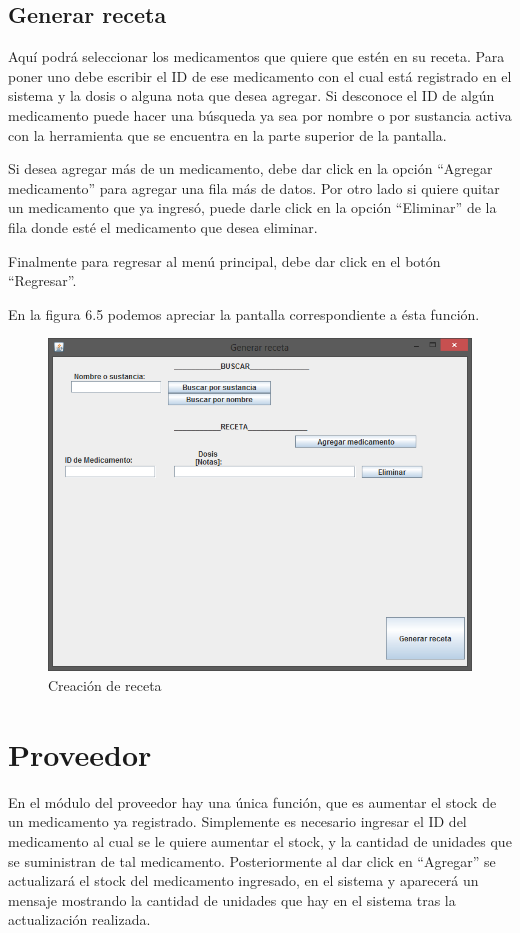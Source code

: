 \subsection{Generar receta}
Aqu\'i podr\'a seleccionar los medicamentos que quiere que est\'en en su receta. Para poner uno debe escribir el ID de ese medicamento con el cual est\'a registrado en el sistema y la dosis o alguna nota que desea agregar. Si desconoce el ID de alg\'un medicamento puede hacer una b\'usqueda ya sea por nombre o por sustancia activa con la herramienta que se encuentra en la parte superior de la pantalla.

Si desea agregar m\'as de un medicamento, debe dar click en la opci\'on "`Agregar medicamento"' para agregar una fila m\'as de datos. Por otro lado si quiere quitar un medicamento que ya ingres\'o, puede darle click en la opci\'on "`Eliminar"' de la fila donde est\'e el medicamento que desea eliminar.

Finalmente para regresar al men\'u principal, debe dar click en el bot\'on "`Regresar"'.

En la figura 6.5 podemos apreciar la pantalla correspondiente a \'esta funci\'on.

\begin{figure}[htbp!]
		\centering		
	\end{figure}
\begin{figure}[htbp!]
\centering
		\includegraphics[width=.9\textwidth]{images/gui/IUCrearReceta}
		\caption{Creaci\'on de receta}
\end{figure}


\section{Proveedor}
En el m\'odulo del proveedor hay una \'unica funci\'on, que es aumentar el stock de un medicamento ya registrado. Simplemente es necesario ingresar el ID del medicamento al cual se le quiere aumentar el stock, y la cantidad de unidades que se suministran de tal medicamento. Posteriormente al dar click en "`Agregar"' se actualizar\'a el stock del medicamento ingresado, en el sistema y aparecer\'a un mensaje mostrando la cantidad de unidades que hay en el sistema tras la actualizaci\'on realizada.


